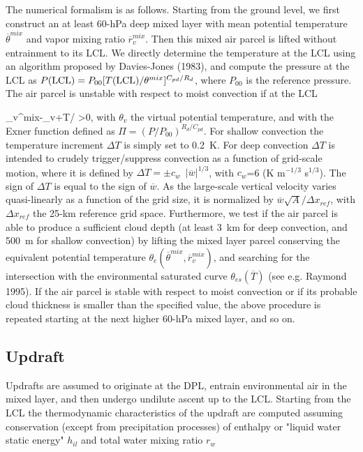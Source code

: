 The numerical formalism is as follows.
Starting from the ground level, we first
construct an at least 60-hPa deep mixed layer with mean potential
temperature
$\overline{\theta}^{mix}$ and vapor mixing ratio $\overline{r}_v^{mix}$.
Then this mixed air parcel is lifted
without entrainment to its LCL.
We directly determine the temperature at the LCL using an
algorithm proposed by Davies-Jones (1983), and
compute the pressure at the LCL as
$P({\rm LCL})=P_{00}[T({\rm LCL})/\theta^{mix}]^{C_{pd}/R_d}$, where
$P_{00}$ is the reference pressure.
The air parcel is unstable with respect to moist
convection if at the LCL

\beq
\overline{\theta}_v^{mix}-\overline{\theta}_v+\Delta T/\Pi\,\,>0,
\label{dt}
\eeq
\noindent
with $\theta_v$ the virtual potential temperature, and
with the Exner function defined as $\Pi=(P/P_{00})^{R_d/C_{pd}}$. For shallow
convection the temperature increment $\Delta T$ is simply set to 0.2~K. For
deep convection $\Delta T$ is intended to crudely trigger/suppress
convection as a function of grid-scale motion, where it is defined by
$\Delta T = \pm c_{w}\,\,\,\vert \overline{w}\vert^{1/3}$,
with $c_w$=6 (K  m$^{-1/3}$ s$^{1/3}$).  The sign of $\Delta T$ is
equal to the sign of $\overline{w}$. As the large-scale vertical
velocity varies quasi-linearly as a function of the grid size, it
is normalized by $\overline{w}
\sqrt{A}/\Delta x_{ref}$,  with
$\Delta x_{ref}$ the 25-km reference grid space. Furthermore,
we test if the air parcel is able to produce a sufficient cloud depth
(at least 3~km for deep convection, and 500~m for shallow convection) by
lifting the  mixed layer parcel conserving the equivalent potential temperature
$\theta_e(\overline{\theta}^{mix},\overline{r}_v^{mix})$, and searching for the
intersection with the environmental saturated curve
$\theta_{es}(\overline{T})$ (see e.g. Raymond 1995).
If the air parcel is stable with
respect to moist convection or if its probable cloud thickness
is smaller than the specified value, the above procedure
is repeated starting at the next higher 60-hPa mixed layer, and so on.


\subsection{Updraft}

Updrafts are assumed to originate at the DPL, entrain environmental air
in the mixed layer, and then undergo undilute ascent up to the LCL.
Starting from the LCL the thermodynamic characteristics of the
updraft  are computed assuming conservation (except from
precipitation processes)
of enthalpy or "liquid water static energy" $h_{il}$ and total
water mixing ratio $r_w$

